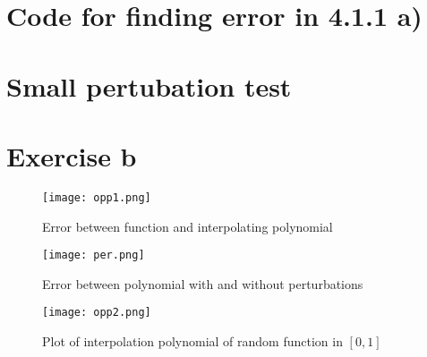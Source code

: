 \documentclass[11pt,a4paper]{report}
\begin{document}
\section*{Code for finding error in 4.1.1 a)}

\section*{Small pertubation test}

\section*{Exercise b}




\begin{figure}
  \texttt{[image: opp1.png]}
  \caption{Error between function and interpolating polynomial}
  \label{Fig 1}
\end{figure}

\begin{figure}
  \texttt{[image: per.png]}
  \caption{Error between polynomial with and without perturbations}
  \label{Fig 2}
\end{figure}

\begin{figure}
  \texttt{[image: opp2.png]}
  \caption{Plot of interpolation polynomial of random function in $[0,1]$ }
  \label{Fig 3}
\end{figure}
\end{document}
